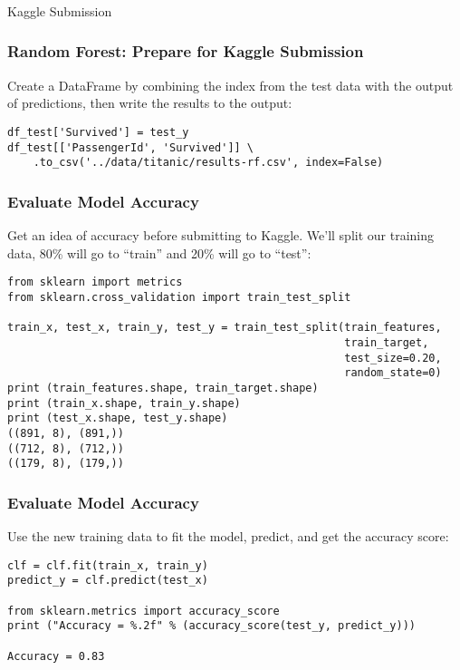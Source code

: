 \begin{frame}[fragile]\frametitle{}
\begin{center}
{\Large Kaggle Submission}
\end{center}
\end{frame}

\begin{frame}[fragile]\frametitle{Random Forest: Prepare for Kaggle Submission}
Create a DataFrame by combining the index from the test data with the output of predictions, then write the results to the output:
\begin{lstlisting}
df_test['Survived'] = test_y
df_test[['PassengerId', 'Survived']] \
    .to_csv('../data/titanic/results-rf.csv', index=False)
\end{lstlisting}
\end{frame}

\begin{frame}[fragile]\frametitle{Evaluate Model Accuracy}
Get an idea of accuracy before submitting to Kaggle.
We'll split our training data, 80\% will go to ``train'' and 20\% will go to ``test'':
\begin{lstlisting}
from sklearn import metrics
from sklearn.cross_validation import train_test_split

train_x, test_x, train_y, test_y = train_test_split(train_features, 
                                                    train_target, 
                                                    test_size=0.20, 
                                                    random_state=0)
print (train_features.shape, train_target.shape)
print (train_x.shape, train_y.shape)
print (test_x.shape, test_y.shape)
((891, 8), (891,))
((712, 8), (712,))
((179, 8), (179,))
\end{lstlisting}
\end{frame}

\begin{frame}[fragile]\frametitle{Evaluate Model Accuracy}
Use the new training data to fit the model, predict, and get the accuracy score:
\begin{lstlisting}
clf = clf.fit(train_x, train_y)
predict_y = clf.predict(test_x)

from sklearn.metrics import accuracy_score
print ("Accuracy = %.2f" % (accuracy_score(test_y, predict_y)))

Accuracy = 0.83
\end{lstlisting}
\end{frame}


